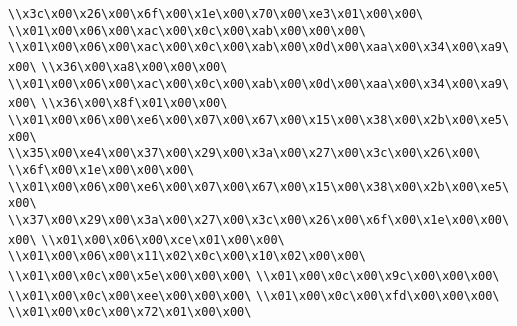 \verb|\\x3c\x00\x26\x00\x6f\x00\x1e\x00\x70\x00\xe3\x01\x00\x00\|\newline
\verb|\\x01\x00\x06\x00\xac\x00\x0c\x00\xab\x00\x00\x00\|\newline
\verb|\\x01\x00\x06\x00\xac\x00\x0c\x00\xab\x00\x0d\x00\xaa\x00\x34\x00\xa9\x00\|\newline
\verb|\\x36\x00\xa8\x00\x00\x00\|\newline
\verb|\\x01\x00\x06\x00\xac\x00\x0c\x00\xab\x00\x0d\x00\xaa\x00\x34\x00\xa9\x00\|\newline
\verb|\\x36\x00\x8f\x01\x00\x00\|\newline
\verb|\\x01\x00\x06\x00\xe6\x00\x07\x00\x67\x00\x15\x00\x38\x00\x2b\x00\xe5\x00\|\newline
\verb|\\x35\x00\xe4\x00\x37\x00\x29\x00\x3a\x00\x27\x00\x3c\x00\x26\x00\|\newline
\verb|\\x6f\x00\x1e\x00\x00\x00\|\newline
\verb|\\x01\x00\x06\x00\xe6\x00\x07\x00\x67\x00\x15\x00\x38\x00\x2b\x00\xe5\x00\|\newline
\verb|\\x37\x00\x29\x00\x3a\x00\x27\x00\x3c\x00\x26\x00\x6f\x00\x1e\x00\x00\x00\|\newline
\verb|\\x01\x00\x06\x00\xce\x01\x00\x00\|\newline
\verb|\\x01\x00\x06\x00\x11\x02\x0c\x00\x10\x02\x00\x00\|\newline
\verb|\\x01\x00\x0c\x00\x5e\x00\x00\x00\|\newline
\verb|\\x01\x00\x0c\x00\x9c\x00\x00\x00\|\newline
\verb|\\x01\x00\x0c\x00\xee\x00\x00\x00\|\newline
\verb|\\x01\x00\x0c\x00\xfd\x00\x00\x00\|\newline
\verb|\\x01\x00\x0c\x00\x72\x01\x00\x00\|\newline
